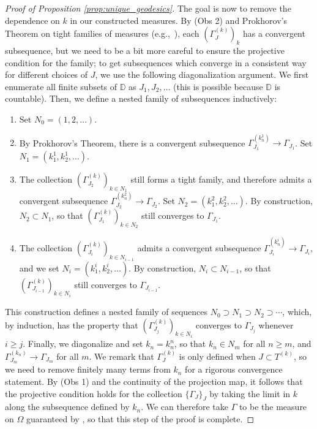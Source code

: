 \documentclass{article}
\theoremstyle{definition}
\begin{document}
\begin{proof}[Proof of Proposition \ref{prop:unique_geodesics}]
The goal is now to remove the dependence on $k$ in our constructed measures. By (Obs 2) and Prokhorov's Theorem on tight families of measures (e.g.,~\cite[Chapter 4]{villani2008optimal}), each $(\Gamma_J^{(k)})_{k}$ has a convergent subsequence, but we need to be a bit more careful to ensure the projective condition for the family; to get subsequences which converge in a consistent way for different choices of $J$, we use the following diagonalization argument. We first enumerate all finite subsets of $\mathbb{D}$ as $J_1,J_2,\ldots$ (this is possible because $\mathbb{D}$ is countable). Then, we define a nested family of subsequences inductively:
\begin{enumerate}
    \item[(0)] Set $N_0 = (1,2,\ldots)$.
    \item[(1)] By Prokhorov's Theorem, there is a convergent subsequence $\Gamma_{J_1}^{(k_n^1)} \to \Gamma_{J_1}$. Set $N_1 = (k_1^1,k_2^1,\ldots)$. 
    \item[(2)] The collection $(\Gamma_{J_2}^{(k)})_{k \in N_1}$ still forms a tight family, and therefore admits a convergent subsequence $\Gamma_{J_2}^{(k_n^2)} \to \Gamma_{J_2}$. Set $N_2 = (k_1^2,k_2^2,\ldots)$. By construction,  $N_2 \subset N_1$, so that $(\Gamma_{J_1}^{(k)})_{k \in N_2}$ still converges to $\Gamma_{J_1}$.
    \item[(i)] The collection $(\Gamma_{J_i}^{(k)})_{k \in N_{i-1}}$  admits a convergent subsequence $\Gamma_{J_i}^{(k_n^i)} \to \Gamma_{J_i}$, and we set $N_i = (k_1^i,k_2^i,\ldots)$. By construction,  $N_{i} \subset N_{i-1}$, so that $(\Gamma_{J_{i-1}}^{(k)})_{k \in N_i}$ still converges to $\Gamma_{J_{i-1}}$. 
\end{enumerate}
This construction defines a nested family of sequences $N_0 \supset N_1 \supset N_2 \supset \cdots$, which, by induction, has the property that $(\Gamma_{J_j}^{(k)})_{k \in N_i}$ converges to $\Gamma_{J_j}$ whenever $i \geq j$. Finally, we diagonalize and set $k_n = k_n^n$, so that $k_n \in N_m$ for all $n \geq m$, and $\Gamma_{J_m}^{(k_n)} \to \Gamma_{J_m}$ for all $m$. We remark that $\Gamma_J^{(k)}$ is only defined when $J\subset T^{(k)}$, so we need to remove finitely many terms from $k_n$ for a rigorous convergence statement.
By (Obs 1) and the continuity of the projection map, it follows that the projective condition holds for the collection $\{\Gamma_J\}_J$ by taking the limit in $k$ along the subsequence defined by $k_n$. We can therefore take $\Gamma$ to be the measure on $\Omega$ guaranteed by \cite[Theorem 8.23]{kallenberg2002foundations}, so that this step of the proof is complete.



\end{proof}
\end{document}
